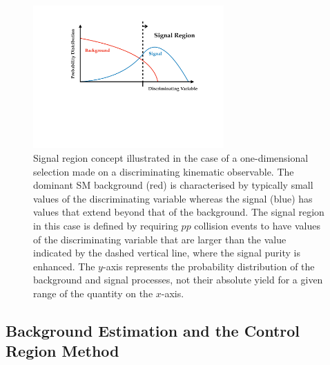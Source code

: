 \begin{figure}[!htb]
    \begin{center}
        \includegraphics[width=0.65\textwidth]{figures/common_ana/sr_search_vPDF}
        \caption{
            Signal region concept illustrated in the case of a one-dimensional selection
            made on a discriminating kinematic observable.
            The dominant SM background (red) is characterised by typically small values
            of the discriminating variable whereas the signal (blue) has values that extend
            beyond that of the background.
            The signal region in this case is defined by requiring $pp$ collision events
            to have values of the discriminating variable that are larger than
            the value indicated by the dashed vertical line, where the signal purity is
            enhanced.
            The $y$-axis represents the probability distribution of the background and signal
            processes, not their absolute yield for a given range of the quantity on the $x$-axis.
        }
        \label{fig:sr_search_v}
    \end{center}
\end{figure}



\FloatBarrier

\subsection{Background Estimation and the Control Region Method}
\label{sec:control_region_method}

